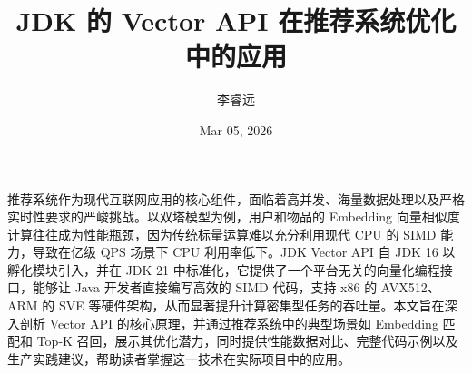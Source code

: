 \title{JDK 的 Vector API 在推荐系统优化中的应用}
\author{李睿远}
\date{Mar 05, 2026}
\maketitle
推荐系统作为现代互联网应用的核心组件，面临着高并发、海量数据处理以及严格实时性要求的严峻挑战。以双塔模型为例，用户和物品的 Embedding 向量相似度计算往往成为性能瓶颈，因为传统标量运算难以充分利用现代 CPU 的 SIMD 能力，导致在亿级 QPS 场景下 CPU 利用率低下。JDK Vector API 自 JDK 16 以孵化模块引入，并在 JDK 21 中标准化，它提供了一个平台无关的向量化编程接口，能够让 Java 开发者直接编写高效的 SIMD 代码，支持 x86 的 AVX512、ARM 的 SVE 等硬件架构，从而显著提升计算密集型任务的吞吐量。本文旨在深入剖析 Vector API 的核心原理，并通过推荐系统中的典型场景如 Embedding 匹配和 Top-K 召回，展示其优化潜力，同时提供性能数据对比、完整代码示例以及生产实践建议，帮助读者掌握这一技术在实际项目中的应用。\par
